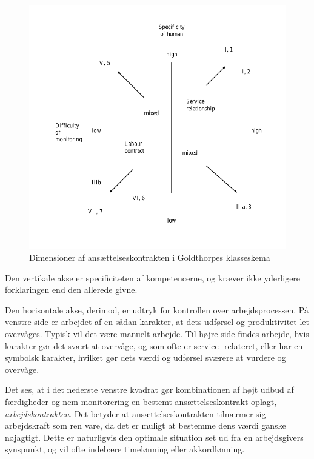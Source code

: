 \begin{figure}[H]
\begin{centering}
	\includegraphics[width=\textwidth]{fig/Goldthorpe_ansaettelseskontrakt.png}
	\caption{Dimensioner af ansættelseskontrakten i Goldthorpes klasseskema}
	\label{fig_teori_klasse_Goldthorpe_arbejdskontraktdimensioner}
\end{centering}
\end{figure}

Den vertikale akse er specificiteten af kompetencerne, og kræver ikke yderligere forklaringen end den allerede givne.

Den horisontale akse, derimod, er udtryk for kontrollen over arbejdsprocessen. På venstre side er arbejdet af en sådan karakter, at dets udførsel og produktivitet let overvåges. Typisk vil det være manuelt arbejde.   
Til højre side findes arbejde, hvis karakter gør det svært at overvåge, og som ofte er service- relateret, eller har en symbolsk karakter, hvilket gør dets værdi og udførsel sværere at vurdere og overvåge. 

Det ses, at i det nederste venstre kvadrat gør kombinationen af højt udbud af færdigheder og nem monitorering en bestemt ansættelseskontrakt oplagt, \emph{arbejdskontrakten}. Det betyder at ansættelseskontrakten tilnærmer sig arbejdskraft som ren vare, da det er muligt at bestemme dens værdi ganske nøjagtigt. Dette er naturligvis den optimale situation set ud fra en arbejdsgivers synspunkt, og vil ofte indebære timelønning eller akkordlønning. %

